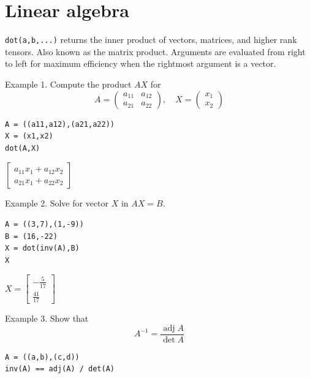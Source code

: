 \documentclass[12pt]{article}
\begin{document}
\newpage

\section{Linear algebra}

\verb$dot(a,b,...)$ returns the inner product of vectors, matrices,
and higher rank tensors.
Also known as the matrix product.
Arguments are evaluated from right to left
for maximum efficiency when the rightmost argument is a vector.

\bigskip

Example 1. Compute the product $AX$ for
\begin{equation*}
A=\begin{pmatrix}a_{11}&a_{12}\\a_{21}&a_{22}\end{pmatrix},
\quad
X=\begin{pmatrix}x_1\\x_2\end{pmatrix}
\end{equation*}

{\color{blue}
\begin{verbatim}
A = ((a11,a12),(a21,a22))
X = (x1,x2)
dot(A,X)
\end{verbatim}
}

$\displaystyle
\begin{bmatrix}
a_{11}x_1+a_{12}x_2
\\[1ex]
a_{21}x_1+a_{22}x_2
\end{bmatrix}
$

\bigskip

Example 2. Solve for vector $X$ in $AX=B$.

{\color{blue}
\begin{verbatim}
A = ((3,7),(1,-9))
B = (16,-22)
X = dot(inv(A),B)
X
\end{verbatim}
}

$\displaystyle
X=
\begin{bmatrix}
-\frac{5}{17}
\\[1ex]
\frac{41}{17}
\end{bmatrix}
$

\bigskip

Example 3. Show that
\begin{equation*}
A^{-1}=\frac{\operatorname{adj}A}{\operatorname{det}A}
\end{equation*}

{\color{blue}
\begin{verbatim}
A = ((a,b),(c,d))
inv(A) == adj(A) / det(A)
\end{verbatim}
}
\end{document}
